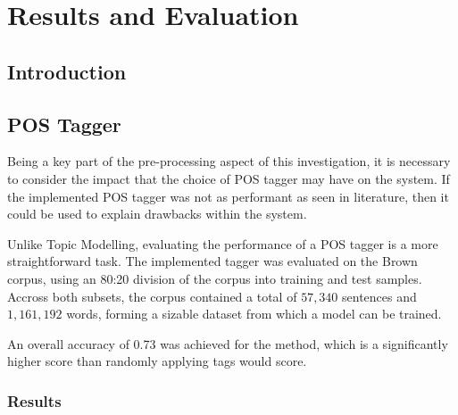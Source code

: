 \documentclass[10pt]{report}
\begin{document}
%
%
%
%
\chapter{Results and Evaluation}
\section{Introduction}

\section{POS Tagger}
Being a key part of the pre-processing aspect of this investigation, it is necessary to consider the impact that the choice of POS tagger may have on the system. If the implemented POS tagger was not as performant as seen in literature, then it could be used to explain drawbacks within the system.

Unlike Topic Modelling, evaluating the performance of a POS tagger is a more straightforward task. The implemented tagger was evaluated on the Brown corpus, using an 80:20 division of the corpus into training and test samples. Accross both subsets, the corpus contained a total of $57,340$ sentences and $1,161,192$ words, forming a sizable dataset from which a model can be trained.

An overall accuracy of 0.73 was achieved for the method, which is a significantly higher score than randomly applying tags would score.

\subsection{Results}
\end{document}
